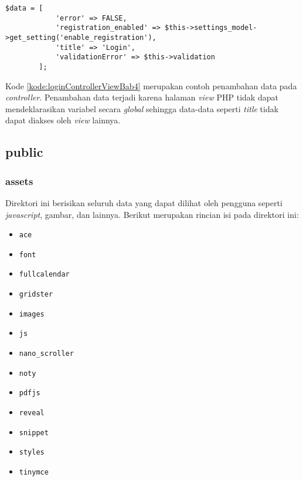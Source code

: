 \begin{lstlisting}[caption=Penambahan kode pada \textit{Login.php}, label=kode:loginControllerViewBab4]
	$data = [
			'error' => FALSE,
			'registration_enabled' => $this->settings_model->get_setting('enable_registration'),
			'title' => 'Login',
			'validationError' => $this->validation
		];
\end{lstlisting}

Kode \ref{kode:loginControllerViewBab4} merupakan contoh penambahan data pada \textit{controller}. Penambahan data terjadi karena halaman \textit{view} PHP tidak dapat mendeklarasikan variabel secara \textit{global} sehingga data-data seperti \textit{title} tidak dapat diakses oleh \textit{view} lainnya.

\subsection{public}
	\subsubsection{assets}
	Direktori ini berisikan seluruh data yang dapat dilihat oleh pengguna seperti \textit{javascript}, gambar, dan lainnya. Berikut merupakan rincian isi pada direktori ini:
	\begin{itemize}
		\item \texttt{ace}
		\item \texttt{font}
		\item \texttt{fullcalendar}
		\item \texttt{gridster}
		\item \texttt{images}
		\item \texttt{js}
		\item \texttt{nano\_scroller}
		\item \texttt{noty}
		\item \texttt{pdfjs}
		\item \texttt{reveal}
		\item \texttt{snippet}
		\item \texttt{styles}
		\item \texttt{tinymce}
	\end{itemize}
